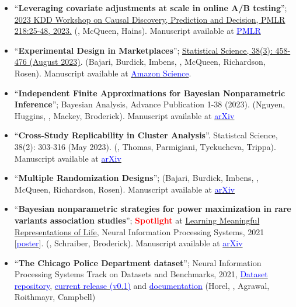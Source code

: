 \begin{itemize}
	\item ``\textbf{Leveraging covariate adjustments at scale in online A/B testing}''; \href{https://proceedings.mlr.press/v218/masoero23a.html}{2023 KDD Workshop on Causal Discovery, Prediction and Decision, PMLR 218:25-48, 2023.} (\mm, McQueen, Hains). Manuscript available at \href{https://proceedings.mlr.press/v218/masoero23a.html}{\textcolor{blue}{PMLR}}
	\item ``\textbf{Experimental Design in Marketplaces}''; \href{https://projecteuclid.org/journals/statistical-science/advance-publication/Experimental-Design-in-Marketplaces/10.1214/23-STS883.short}{Statistical Science, 38(3): 458-476 (August 2023)}. (Bajari, Burdick, Imbens, \mm, McQueen, Richardson, Rosen). Manuscript available at \href{https://www.amazon.science/publications/experimental-design-in-marketplaces}{\textcolor{blue}{Amazon Science}}.
	\item ``\textbf{Independent Finite Approximations for Bayesian Nonparametric Inference}''; Bayesian Analysis, Advance Publication 1-38 (2023). (Nguyen, Huggins, \mm, Mackey, Broderick). Manuscript available at \href{https://arxiv.org/pdf/2009.10780.pdf}{\textcolor{blue}{arXiv}}
	\item``\textbf{Cross-Study Replicability in Cluster Analysis}''. Statistcal Science, 38(2): 303-316 (May 2023).  (\mm, Thomas, Parmigiani, Tyekucheva, Trippa). Manuscript available at \href{https://arxiv.org/pdf/2202.01910.pdf}{\textcolor{blue}{arXiv}}
	\item ``\textbf{Multiple Randomization Designs}''; (Bajari, Burdick, Imbens, \mm, McQueen, Richardson, Rosen). Manuscript available at \href{https://arxiv.org/pdf/2112.13495.pdf}{\textcolor{blue}{arXiv}}
	\item ``\textbf{Bayesian nonparametric strategies for power maximization in rare variants association studies}''; \textcolor{red}{\textbf{Spotlight}} at \href{https://www.lmrl.org/}{Learning Meaningful Representations of Life},  Neural Information Processing Systems, 2021 [\href{https://lorenzomasoero.com/files/LRML_21_poster.pdf}{\textcolor{blue}{poster}}]. (\mm, Schraiber, Broderick). Manuscript available at \href{https://arxiv.org/pdf/2112.02032.pdf}{\textcolor{blue}{arXiv}}
	\item ``\textbf{The Chicago Police Department dataset}''; Neural Information Processing Systems Track on Datasets and Benchmarks, 2021, \href{https://github.com/chicago-police-violence/data}{\textcolor{blue}{Dataset repository}}, \href{https://github.com/chicago-police-violence/data/releases/tag/v0.1}{\textcolor{blue}{current release (v0.1)}} and \href{https://github.com/chicago-police-violence/data/releases/download/v0.1/documentation.pdf}{\textcolor{blue}{documentation}} (Horel, \mm, Agrawal, Roithmayr, Campbell)

\end{itemize}

